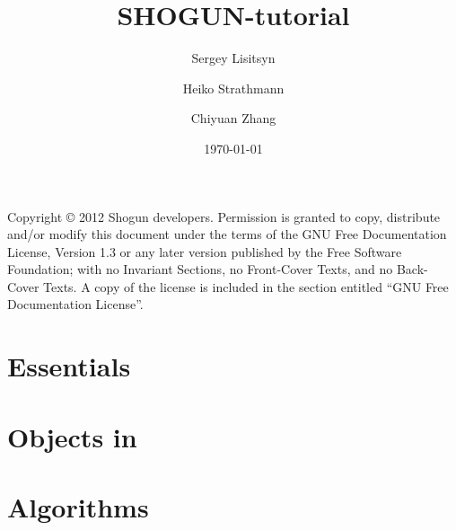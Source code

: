 \documentclass{shogun_tutorial}
\title{SHOGUN-tutorial}
\date{\today}
\author
{
Sergey Lisitsyn \and 
Heiko Strathmann \and 
Chiyuan Zhang \and 
}
\begin{document}
	\maketitle
	Copyright \copyright{}  2012 Shogun developers.
    Permission is granted to copy, distribute and/or modify this document
    under the terms of the GNU Free Documentation License, Version 1.3
    or any later version published by the Free Software Foundation;
    with no Invariant Sections, no Front-Cover Texts, and no Back-Cover Texts.
    A copy of the license is included in the section entitled ``GNU
    Free Documentation License''.
    
    
	\tableofcontents
	\listoftodos
	\part{Essentials}
	
	
	\part{Objects in \shogun{}}
	
	
	
	\part{Algorithms}
	
	
	
	
	
	
	\begin{appendix}
	
	\end{appendix}
	
	
	 
\end{document}
